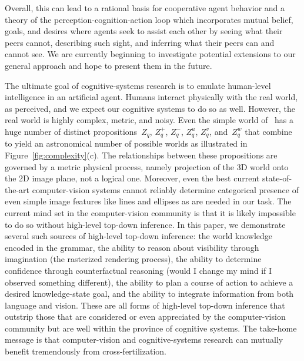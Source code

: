 Overall, this can lead to a rational basis for cooperative agent behavior and a
theory of the perception-cognition-action loop which incorporates mutual
belief, goals, and desires where agents seek to assist each other by seeing
what their peers cannot, describing such sight, and inferring what their peers
can and cannot see.
%
We are currently beginning to investigate potential extensions to our
general approach and hope to present them in the future.

The ultimate goal of cognitive-systems research is to emulate human-level
intelligence in an artificial agent.
%
Humans interact physically with the real world, as perceived, and we expect our
cognitive systems to do so as well.
%
However, the real world is highly complex, metric, and noisy.
%
Even the simple world of \LincolnLogs\ has a huge number of distinct
propositions~$Z_q$, $Z^+_q$, $Z^-_q$, $Z^u_q$, $Z^v_q$, and~$Z^w_q$ that
combine to yield an astronomical number of possible worlds as illustrated in
Figure~\ref{fig:complexity}(c).
%
The relationships between these propositions are governed by a metric physical
process, namely projection of the 3D world onto the 2D image plane, not a
logical one.
%
Moreover, even the best current state-of-the-art computer-vision systems cannot
reliably determine categorical presence of even simple image features like
lines and ellipses as are needed in our task.
%
The current mind set in the computer-vision community is that it is likely
impossible to do so without high-level top-down inference.
%
In this paper, we demonstrate several such sources of high-level top-down
inference: the world knowledge encoded in the grammar, the ability to reason
about visibility through imagination (the rasterized rendering process), the
ability to determine confidence through counterfactual reasoning (would I
change my mind if I observed something different), the ability to plan a course
of action to achieve a desired knowledge-state goal, and the ability to
integrate information from both language and vision.
%
These are all forms of high-level top-down inference that outstrip those that are
considered or even appreciated by the computer-vision community but are well
within the province of cognitive systems.
%
The take-home message is that computer-vision and cognitive-systems research
can mutually benefit tremendously from cross-fertilization.

